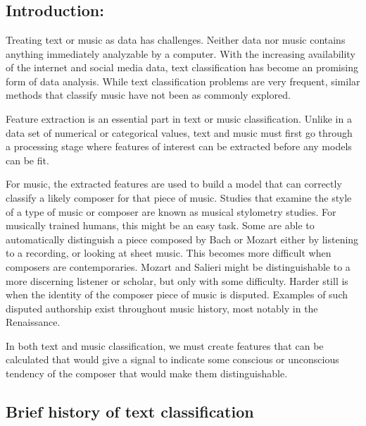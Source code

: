 \documentclass[12pt,twoside]{reedthesis}
\theoremstyle{definition}
\theoremstyle{definition}
\theoremstyle{definition}
\theoremstyle{remark}
\begin{document}
\mainmatter %
\pagestyle{fancyplain} %

\chapter{}\label{section}

\section{Introduction:}\label{introduction}

Treating text or music as data has challenges. Neither data nor music
contains anything immediately analyzable by a computer. With the
increasing availability of the internet and social media data, text
classification has become an promising form of data analysis. While text
classification problems are very frequent, similar methods that classify
music have not been as commonly explored.

Feature extraction is an essential part in text or music classification.
Unlike in a data set of numerical or categorical values, text and music
must first go through a processing stage where features of interest can
be extracted before any models can be fit.

For music, the extracted features are used to build a model that can
correctly classify a likely composer for that piece of music. Studies
that examine the style of a type of music or composer are known as
musical stylometry studies. For musically trained humans, this might be
an easy task. Some are able to automatically distinguish a piece
composed by Bach or Mozart either by listening to a recording, or
looking at sheet music. This becomes more difficult when composers are
contemporaries. Mozart and Salieri might be distinguishable to a more
discerning listener or scholar, but only with some difficulty. Harder
still is when the identity of the composer piece of music is disputed.
Examples of such disputed authorship exist throughout music history,
most notably in the Renaissance.

In both text and music classification, we must create features that can
be calculated that would give a signal to indicate some conscious or
unconscious tendency of the composer that would make them
distinguishable.

\section{Brief history of text
classification}\label{brief-history-of-text-classification}
\end{document}
